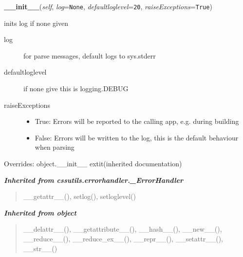 \hspace{.8\funcindent}\begin{boxedminipage}{\funcwidth}

    \raggedright \textbf{\_\_init\_\_}(\textit{self}, \textit{log}={\tt None}, \textit{defaultloglevel}={\tt 20}, \textit{raiseExceptions}={\tt True})

\setlength{\parskip}{2ex}

inits log if none given
\begin{description}
\item[{log}] \leavevmode 
for parse messages, default logs to sys.stderr

\item[{defaultloglevel}] \leavevmode 
if none give this is logging.DEBUG

\item[{raiseExceptions}] \leavevmode \begin{itemize}
\item {} 
True: Errors will be reported to the calling app,
e.g. during building

\item {} 
False: Errors will be written to the log, this is the
default behaviour when parsing

\end{itemize}

\end{description}
\setlength{\parskip}{1ex}
      Overrides: object.\_\_init\_\_ 	extit{(inherited documentation)}

    \end{boxedminipage}


\large{\textbf{\textit{Inherited from cssutils.errorhandler.\_ErrorHandler}}}

\begin{quote}
\_\_getattr\_\_(), setlog(), setloglevel()
\end{quote}

\large{\textbf{\textit{Inherited from object}}}

\begin{quote}
\_\_delattr\_\_(), \_\_getattribute\_\_(), \_\_hash\_\_(), \_\_new\_\_(), \_\_reduce\_\_(), \_\_reduce\_ex\_\_(), \_\_repr\_\_(), \_\_setattr\_\_(), \_\_str\_\_()
\end{quote}


